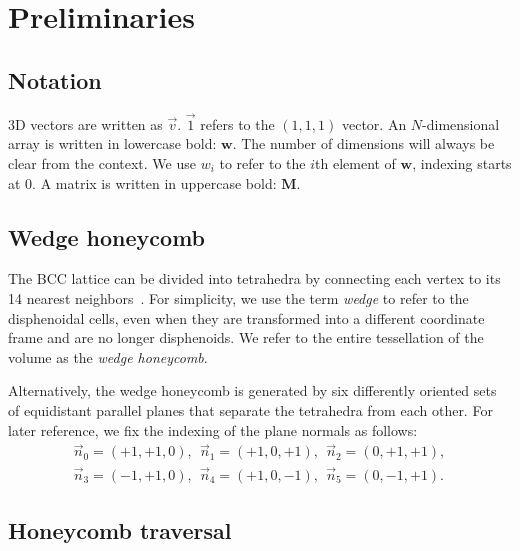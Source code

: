 \documentclass[journal]{vgtc}                     %
\begin{document}
\section{Preliminaries}

\subsection{Notation}
3D vectors are written as $\vec{v}$. $\vec{1}$ refers to the $(1,1,1)$ vector. An $N$-dimensional array is written in lowercase bold: $\mathbf{w}$. The number of dimensions will always be clear from the context. We use $w_i$ to refer to the $i$th element of $\mathbf{w}$, indexing starts at $0$. A matrix is written in uppercase bold: $\mathbf{M}$.

\subsection{Wedge honeycomb}

The BCC lattice can be divided into tetrahedra by connecting each vertex to its 14 nearest neighbors~\cite{CHAN199883}. For simplicity, we use the term \emph{wedge} to refer to the disphenoidal cells, even when they are transformed into a different coordinate frame and are no longer disphenoids. We refer to the entire tessellation of the volume as the \emph{wedge honeycomb}.

Alternatively, the wedge honeycomb is generated by six differently oriented sets of equidistant parallel planes that separate the tetrahedra from each other. For later reference, we fix the indexing of the plane normals as follows:
\begin{equation} \label{eq:normals}
	\begin{split}
		\vec{n}_0 = (+1, +1, 0), \ \
		\vec{n}_1 =(+1, 0, +1), \ \ 
		\vec{n}_2 =(0, +1, +1), \\
		\vec{n}_3 =(-1, +1, 0), \ \ 
		\vec{n}_4 =(+1, 0, -1), \ \ 
		\vec{n}_5 =(0, -1, +1).
	\end{split}
\end{equation}

\subsection{Honeycomb traversal}
\end{document}
